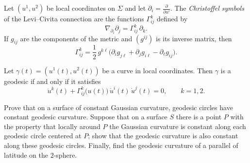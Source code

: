 \begin{solution}
	\begin{definition}
		Let $(u^1,u^2)$ be local coordinates on $\Sigma$ and let
		$\partial_i=\frac{\partial}{\partial u^i}$.
		The \emph{Christoffel symbols} of the Levi--Civita connection are
		the functions $\Gamma^k_{ij}$ defined by
		\[
		\nabla_{\partial_i}\partial_j
		= \Gamma^k_{ij}\,\partial_k.
		\]
		If $g_{ij}$ are the components of the metric and $(g^{ij})$ is its
		inverse matrix, then
		\[
		\Gamma^k_{ij}
		=
		\frac12\,g^{k\ell}\bigl(
		\partial_i g_{j\ell} + \partial_j g_{i\ell} - \partial_\ell g_{ij}
		\bigr).
		\]
	\end{definition}
	
	\begin{proposition}
		Let $\gamma(t)=(u^1(t),u^2(t))$ be a curve in local coordinates.
		Then $\gamma$ is a geodesic if and only if it satisfies
		\[
		\ddot u^k(t) + \Gamma^k_{ij}\bigl(u(t)\bigr)\,\dot u^i(t)\,\dot u^j(t)
		= 0,\qquad k=1,2.
		\]
	\end{proposition}

\end{solution}

\begin{problem}
\label{prob:cp-vii-0068}
Prove that on a surface of constant Gaussian curvature, geodesic circles have constant geodesic curvature.
Suppose that on a surface \(S\) there is a point \(P\) with the property that locally around \(P\) the Gaussian curvature is constant along each geodesic circle centered at \(P\); show that the geodesic curvature is also constant along these geodesic circles.
Finally, find the geodesic curvature of a parallel of latitude on the \(2\)-sphere.
\end{problem}

